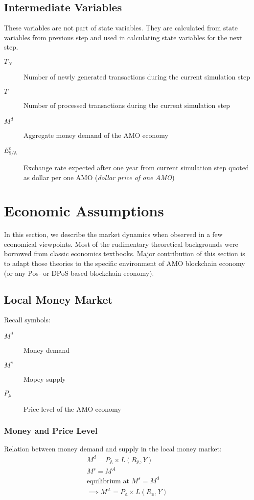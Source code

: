 \documentclass[a4paper,11pt]{scrartcl}
\newcommand{\amom}{\mathbb{A}}
\begin{document}
\subsection{Intermediate Variables}
These variables are not part of state variables. They are calculated from state
variables from previous step and used in calculating state variables for the
next step.

\begin{description}
	\item[$T_N$] Number of newly generated transactions during the current
		simulation step
	\item[$T$] Number of processed transactions during the current simulation
		step
	\item[$M^d$] Aggregate money demand of the AMO economy
	\item[$E^e_{\$/\amom}$] Exchange rate expected after one year from
		current simulation step quoted as dollar per one AMO
		(\emph{dollar price of one AMO})
\end{description}

\section{Economic Assumptions}
In this section, we describe the market dynamics when observed in a few
economical viewpoints. Most of the rudimentary theoretical backgrounds were
borrowed from classic economics textbooks. Major contribution of this section
is to adapt those theories to the specific environment of AMO blockchain
economy (or any Pos- or DPoS-based blockchain economy).

\subsection{Local Money Market}
Recall symbols:
\begin{description}
	\item[$M^d$] Money demand
	\item[$M^s$] Mopey supply
	\item[$P_\amom$] Price level of the AMO economy
\end{description}

\subsubsection{Money and Price Level}
Relation between money demand and supply in the local money market:
\begin{eqnarray}
	M^d = P_\amom \times L(R_\amom,Y) \label{localdemand} \\
	M^s = M^A \\
	\text{equilibrium at\ } M^s = M^d \\
	\implies M^A = P_\amom \times L(R_\amom,Y) \label{eq1}
\end{eqnarray}
\end{document}
